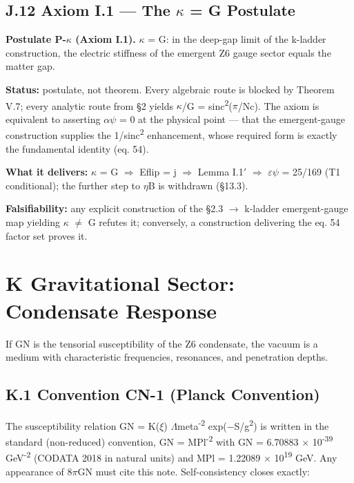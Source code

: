 \documentclass[11pt,letterpaper]{article}
\begin{document}
\subsection*{J.12  Axiom I.1 --- The $\kappa$ = G Postulate}

\noindent \textbf{Postulate P-$\kappa$ (Axiom I.1). }$\kappa$ = G: in the deep-gap limit of the k-ladder construction, the electric stiffness of the emergent Z6 gauge sector equals the matter gap.

\noindent \textbf{Status: }postulate, not theorem. Every algebraic route is blocked by Theorem V.7; every analytic route from §2 yields $\kappa$/G = sinc\textsuperscript{2}($\pi$/Nc). The axiom is equivalent to asserting $\alpha$$\psi$ = 0 at the physical point --- that the emergent-gauge construction supplies the 1/sinc\textsuperscript{2} enhancement, whose required form is exactly the fundamental identity (eq. 54).

\noindent \textbf{What it delivers: }$\kappa$ = G $\Rightarrow$ Eflip = j $\Rightarrow$ Lemma I.1$'$ $\Rightarrow$ $\varepsilon$$\psi$ = 25/169 (T1 conditional); the further step to $\eta$B is withdrawn (§13.3).

\noindent \textbf{Falsifiability: }any explicit construction of the §2.3 $\to$ k-ladder emergent-gauge map yielding $\kappa$ $\ne$ G refutes it; conversely, a construction delivering the eq. 54 factor set proves it.

\section*{K  Gravitational Sector: Condensate Response}

\noindent If GN is the tensorial susceptibility of the Z6 condensate, the vacuum is a medium with characteristic frequencies, resonances, and penetration depths.

\subsection*{K.1  Convention CN-1 (Planck Convention)}

\noindent The susceptibility relation GN = K($\xi$) $\Lambda$meta\textsuperscript{-2} exp($-$S/g\textsuperscript{2}) is written in the standard (non-reduced) convention, GN = MPl\textsuperscript{-2} with GN = 6.70883 $\times$ 10\textsuperscript{-39} GeV\textsuperscript{-2} (CODATA 2018 in natural units) and MPl = 1.22089 $\times$ 10\textsuperscript{19} GeV. Any appearance of 8$\pi$GN must cite this note. Self-consistency closes exactly:
\end{document}
